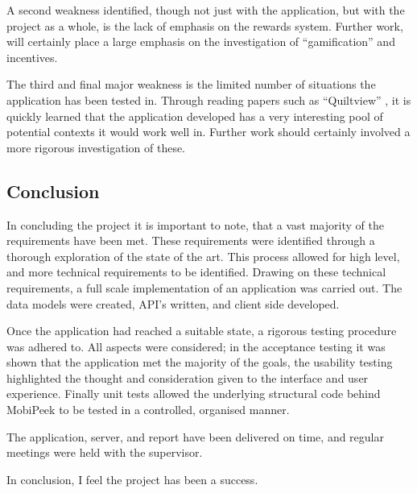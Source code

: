 \documentclass[a4paper]{article}
\begin{document}
A second weakness identified, though not just with the application, but with the project as a whole, is the lack of emphasis on the rewards system. Further work, will certainly place a large emphasis on the investigation of ``gamification'' and incentives. 

The third and final major weakness is the limited number of situations the application has been tested in. Through reading papers such as ``Quiltview'' \cite{chen2014quiltview}, it is quickly learned that the application developed has a very interesting pool of potential contexts it would work well in. Further work should certainly involved a more rigorous investigation of these.

\subsection{Conclusion}
In concluding the project it is important to note, that a vast majority of the requirements have been met. These requirements were identified through a thorough exploration of the state of the art. This process allowed for high level, and more technical requirements to be identified. Drawing on these technical requirements, a full scale implementation of an application was carried out. The data models were created, API's written, and client side developed. 

Once the application had reached a suitable state, a rigorous testing procedure was adhered to. All aspects were considered; in the acceptance testing it was shown that the application met the majority of the goals, the usability testing highlighted the thought and consideration given to the interface and user experience. Finally unit tests allowed the underlying structural code behind MobiPeek to be tested in a controlled, organised manner.

The application, server, and report have been delivered on time, and regular meetings were held with the supervisor.

In conclusion, I feel the project has been a success.
\listoffigures


\end{document}
